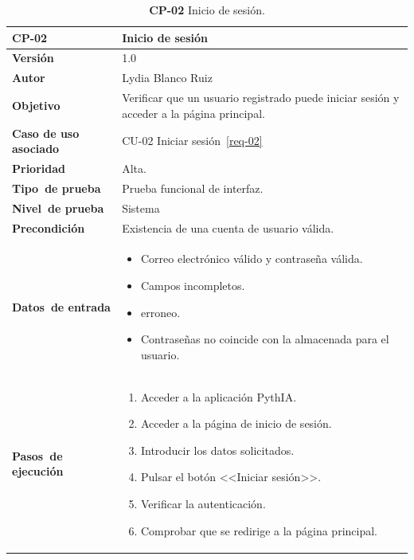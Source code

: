 \begin{table}[p]
	\centering
	\begin{tabularx}{\linewidth}{ p{} p{} }
		\toprule
		\textbf{CP-02}    & \textbf{Inicio de sesión}\\
		\toprule
		\textbf{Versión}              & 1.0    \\
		\textbf{Autor}                & Lydia Blanco Ruiz \\
		\textbf{Objetivo}			 & Verificar que un usuario registrado puede iniciar sesión y acceder a la página principal.\\
		\textbf{Caso de uso asociado} &  CU-02 Iniciar sesión~\ref{req-02}\\
		\textbf{Prioridad}          & Alta. \\
		\textbf{\mbox{Tipo de} \mbox{prueba}}         & Prueba funcional de interfaz. \\
		\textbf{\mbox{Nivel de} \mbox{prueba}}        & Sistema\\
		\textbf{Precondición}        & Existencia de una cuenta de usuario válida. \\
		\textbf{\mbox{Datos de} \mbox{entrada}} 		& 
		\begin{itemize}
		\tightlist
			\item Correo electrónico válido y contraseña válida.
			\item Campos incompletos.
			\item \eng{Email} erroneo.
			\item Contraseñas no coincide con la almacenada para el usuario.
		\end{itemize}				
		\\
		\textbf{\mbox{Pasos de} \mbox{ejecución}}		&
		\begin{enumerate}
		\tightlist
			\item Acceder a la aplicación \eng{web} PythIA.
			\item Acceder a la página de inicio de sesión.
			\item Introducir los datos solicitados.
			\item Pulsar el botón <<Iniciar sesión>>.
			\item Verificar la autenticación.
			\item Comprobar que se redirige a la página principal.
		\end{enumerate} \\
		\bottomrule
	\end{tabularx}
	\caption{\textbf{CP-02} Inicio de sesión.}
	\label{prueb-02}
\end{table}


